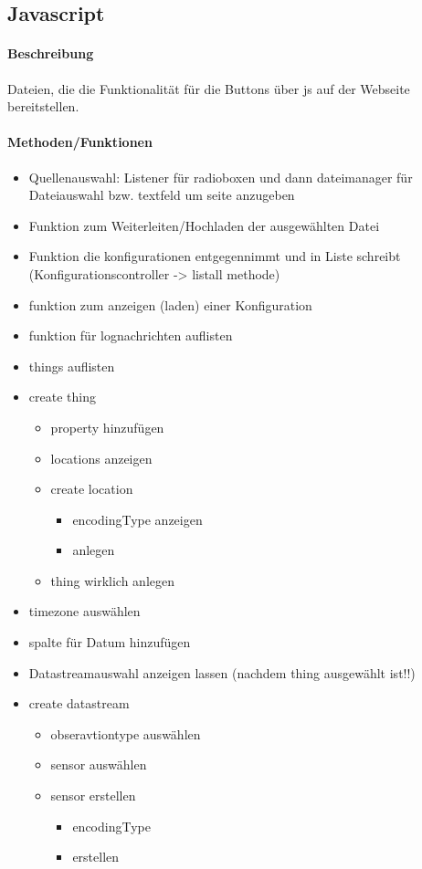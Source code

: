 \subsection{Javascript}

\paragraph{Beschreibung}
Dateien, die die Funktionalität für die Buttons über js auf der Webseite bereitstellen.

\paragraph{Methoden/Funktionen}
\begin{itemize}
\item Quellenauswahl: Listener für radioboxen und dann dateimanager für Dateiauswahl bzw. textfeld um seite anzugeben
\item Funktion zum Weiterleiten/Hochladen der ausgewählten Datei
\item Funktion die konfigurationen entgegennimmt und in Liste schreibt (Konfigurationscontroller -> listall methode)
\item funktion zum anzeigen (laden) einer Konfiguration
\item funktion für lognachrichten auflisten

\item things auflisten
\item create thing 
\begin{itemize}
\item property hinzufügen
\item locations anzeigen
\item create location
\begin{itemize}
\item encodingType anzeigen
\item anlegen
\end{itemize}
\item thing wirklich anlegen
\end{itemize}


\item timezone auswählen
\item spalte für Datum hinzufügen
\item Datastreamauswahl anzeigen lassen (nachdem thing ausgewählt ist!!)
\item create datastream
\begin{itemize}
\item obseravtiontype auswählen
\item sensor auswählen
\item sensor erstellen
\begin{itemize}
\item encodingType
\item erstellen
\end{itemize}


\end{itemize}
\end{itemize}
